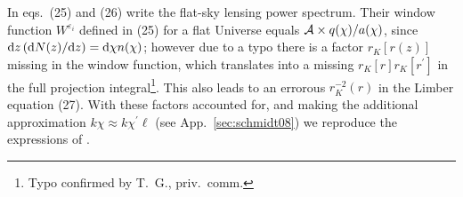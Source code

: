 \documentclass[fleqn,usenatbib]{mnras} %
\newcommand{\pref}{{\cal A}}
\begin{document}
\begin{appendix}
In eqs.~(25) and (26) \cite{2012MNRAS.422.2854G} write the flat-sky lensing
power spectrum. Their window function $W^{\varepsilon_i}$ defined in (25) for a
flat Universe equals $\pref \times q(\chi) / a(\chi)$, since ${\rm d} z \,
({\rm d} N(z)/{\rm d} z) = {\rm d} \chi n(\chi)$; however due to a typo there
is a factor $r_K[r(z)]$ missing in the window function, which translates into a
missing $r_K[r] r_K[r^\prime]$ in the full projection integral\footnote{Typo
confirmed by T.~G., priv.~comm.}. This also leads to an errorous $r_K^{-2}(r)$
in the Limber equation (27). With these factors accounted for, and making the
additional approximation $k \chi \approx k \chi^\prime \ell$ (see
App.~\ref{sec:schmidt08}) we reproduce the expressions of
\cite{2012MNRAS.422.2854G}.


\label{lastpage}

\end{appendix}
\end{document}
